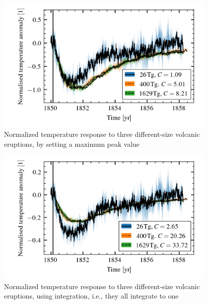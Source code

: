 \documentclass{ametsocV5}
\begin{document}
\begin{figure}
  \begin{center}
    \includegraphics[width=0.95\textwidth]{figures/compare-waveform-max.png}
  \end{center}
  \caption{Normalized temperature response to three different-size volcanic eruptions,
    by setting a maximum peak value}
  \label{fig:temp_norm_max}
\end{figure}

\begin{figure}
  \begin{center}
    \includegraphics[width=0.95\textwidth]{figures/compare-waveform-integrate.png}
  \end{center}
  \caption{Normalized temperature response to three different-size volcanic eruptions,
    using integration, i.e., they all integrate to one}
  \label{fig:temp_norm_int}
\end{figure}
\end{document}
